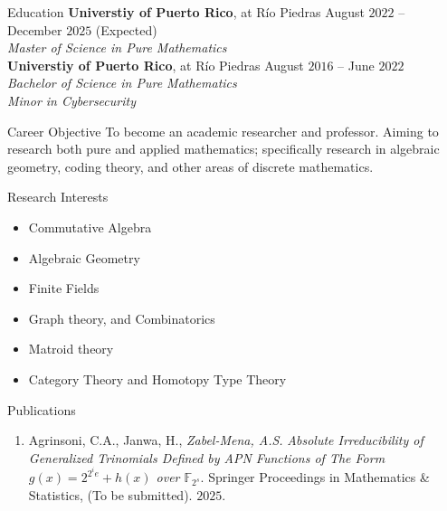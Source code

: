 \documentclass{resume}
\begin{document}
\begin{rSection}{Education}
  \textbf{Universtiy of Puerto Rico}, at R\'io Piedras
  \hfill August $2022$ -- December $2025$ (Expected)  \\
  \textit{Master of Science in Pure Mathematics} \\

  \textbf{Universtiy of Puerto Rico}, at R\'io Piedras
  \hfill August $2016$ -- June $2022$  \\
  \textit{Bachelor of Science in Pure Mathematics}  \\
  \textit{Minor in Cybersecurity}
\end{rSection}

\begin{rSection}{Career Objective}
  To become an academic researcher and professor. Aiming to research both pure
  and applied mathematics; specifically research in algebraic
  geometry, coding theory, and other areas of discrete mathematics.
\end{rSection}

\begin{rSection}{Research Interests}
  \begin{multicols}{2}
    \begin{itemize}
      \item Commutative Algebra

      \item Algebraic Geometry

      \item Finite Fields

      \item Graph theory, and Combinatorics

      \item Matroid theory

      \item Category Theory and Homotopy Type Theory
    \end{itemize}
  \end{multicols}
\end{rSection}


\begin{rSection}{Publications}
  \begin{enumerate}
    \item Agrinsoni, C.A., Janwa, H., \textit{Zabel-Mena, A.S.}
      \textit{Absolute Irreducibility of Generalized
        Trinomials Defined by APN Functions of The Form
      $g(x)=2^{2^ie}+h(x)$ over $\mathbb{F}_{2^s}$}. Springer
      Proceedings in Mathematics \& Statistics, (To be submitted).
      $2025$.
  \end{enumerate}
\end{rSection}
\end{document}
